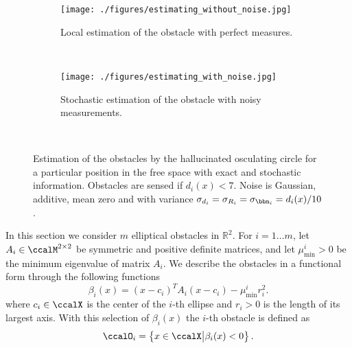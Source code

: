 \documentclass[article]{IEEEtran}
\theoremstyle{definition}
\begin{document}
\begin{figure*}
        \centering
        \begin{subfigure}[b]{0.49\linewidth}
                \texttt{[image: ./figures/estimating\_without\_noise.jpg]}
                \caption{Local estimation of the obstacle with perfect measures.}
                \label{fig_no_noise}
        \end{subfigure}
        ~
        \begin{subfigure}[b]{0.49\linewidth}
                \texttt{[image: ./figures/estimating\_with\_noise.jpg]}
                \caption{Stochastic estimation of the obstacle with noisy measurements. }
                \label{fig_noise}
        \end{subfigure}
        ~ \caption{Estimation of the obstacles by the hallucinated osculating circle for a particular position in the free space with exact and stochastic information. Obstacles are sensed if $d_i(x)<7$. Noise is Gaussian, additive, mean zero and with variance $\sigma_{d_i}=\sigma_{R_i}=\sigma_{\bbn_i}=d_i(x)/10$.  }\label{fig_obstacle_estimation}
\end{figure*}
%
%
In this section we consider $m$ elliptical obstacles in $\mathbb{R}^2$. For $i=1\ldots m$, let $A_i \in \ccalM^{2\times 2}$ be symmetric  and positive definite matrices, and let $\mu_{\min}^i>0$ be the minimum eigenvalue of matrix $A_i$. We describe the obstacles in a functional form through the following functions 
%
\begin{equation}
\beta_i(x) = (x-c_i)^T A_i (x-c_i) - \mu_{\min}^i r_i^2.
\end{equation}
%
where $c_i \in \ccalX$ is the center of the $i$-th ellipse and $r_i>0$ is the length of its largest axis. With this selection of $\beta_i(x)$ the $i$-th obstacle is defined as 
%
\begin{equation}
\ccalO_i = \left\{x \in \ccalX \big|  \beta_i(x) < 0\right\}.
\end{equation}
%
\end{document}
